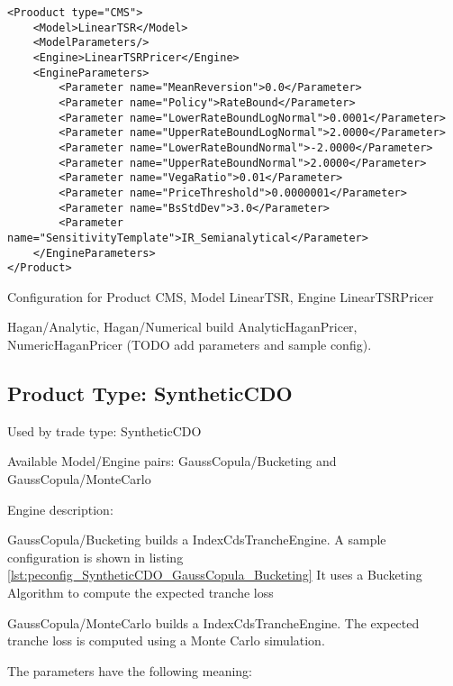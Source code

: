 \begin{longlisting}
\begin{verbatim}
<Prooduct type="CMS">
    <Model>LinearTSR</Model>
    <ModelParameters/>
    <Engine>LinearTSRPricer</Engine>
    <EngineParameters>
        <Parameter name="MeanReversion">0.0</Parameter>
        <Parameter name="Policy">RateBound</Parameter>
        <Parameter name="LowerRateBoundLogNormal">0.0001</Parameter>
        <Parameter name="UpperRateBoundLogNormal">2.0000</Parameter>
        <Parameter name="LowerRateBoundNormal">-2.0000</Parameter>
        <Parameter name="UpperRateBoundNormal">2.0000</Parameter>
        <Parameter name="VegaRatio">0.01</Parameter>
        <Parameter name="PriceThreshold">0.0000001</Parameter>
        <Parameter name="BsStdDev">3.0</Parameter>
        <Parameter name="SensitivityTemplate">IR_Semianalytical</Parameter>
    </EngineParameters>
</Product>
\end{verbatim}
\caption{Configuration for Product CMS, Model LinearTSR, Engine LinearTSRPricer}
\label{lst:peconfig_CMS_LinearTSR_LinearTSRPricer}
\end{longlisting}

Hagan/Analytic, Hagan/Numerical build AnalyticHaganPricer, NumericHaganPricer (TODO add parameters and sample config).

\subsection{Product Type: SyntheticCDO}

Used by trade type: SyntheticCDO

Available Model/Engine pairs: GaussCopula/Bucketing and GaussCopula/MonteCarlo

Engine description:

GaussCopula/Bucketing builds a IndexCdsTrancheEngine. A sample configuration is shown in listing
\ref{lst:peconfig_SyntheticCDO_GaussCopula_Bucketing} It uses a Bucketing Algorithm  to compute the expected tranche loss

GaussCopula/MonteCarlo builds a IndexCdsTrancheEngine. The expected tranche loss is computed using a Monte Carlo simulation.

The parameters have the following meaning:

